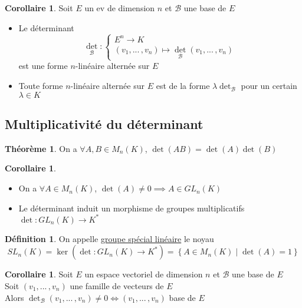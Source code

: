 \documentclass[10pt,a4paper]{article}
\theoremstyle{definition}
\newtheorem{theorem}[proposition]{Théorème}
\newtheorem{corollaire}[proposition]{Corollaire}
\newtheorem{definition}[proposition]{Définition}
\begin{document}
\pagebreak

\begin{corollaire}
Soit $E$ un ev de dimension $n$ et $\mathcal{B}$ une base de $E$
\begin{itemize}
\item Le déterminant
\[\textstyle{\det_\mathcal{B}} : \begin{cases}
E^n \to K \\
(v_1, ...\,, v_n) \mapsto \det_\mathcal{B} (v_1, ...\,, v_n)
\end{cases}\]
est une forme $n$-linéaire alternée sur $E$
\item Toute forme $n$-linéaire alternée sur $E$ est de la forme $\lambda \det_\mathcal{B}$ pour un certain $\lambda \in K$
\end{itemize}
\end{corollaire}

\subsection{Multiplicativité du déterminant}
\begin{theorem}
On a $\forall A, B \in M_n(K)$, $\det(AB) = \det(A) \det(B)$
\end{theorem}
\begin{corollaire}
\hfill
\begin{itemize}
\item On a $\forall A \in M_n(K)$, $\det(A) \neq 0 \implies A \in GL_n(K)$
\item Le déterminant induit un morphisme de groupes multiplicatifs \\
$\det: GL_n(K) \to K^*$
\end{itemize}
\end{corollaire}
\begin{definition}
On appelle \uline{groupe spécial linéaire} le noyau
\[ SL_n(K) = \ker(\det: GL_n(K) \to K^*) = \left\{ A \in M_n(K) \mid \det(A) = 1 \right\}\]
\end{definition}
\begin{corollaire}
Soit $E$ un espace vectoriel de dimension $n$ et $\mathcal{B}$ une base de $E$ \\
Soit $(v_1, ...\,, v_n)$ une famille de vecteurs de $E$ \\
Alors $\det_\mathcal{B}(v_1, ...\,, v_n) \neq 0 \iff (v_1, ...\,, v_n)$ base de $E$
\end{corollaire}
\end{document}
